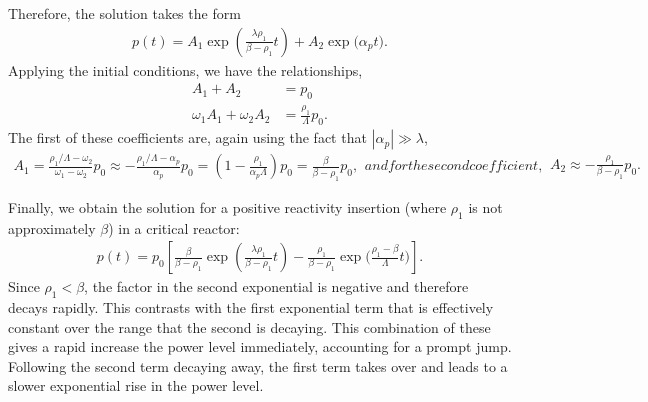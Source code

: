 Therefore, the solution takes the form
\begin{align}
  p(t) = A_1 \exp\left(  \frac{ \lambda \rho_1 }{ \beta - \rho_1 } t \right) + A_2 \exp\bigg( \alpha_p t \bigg) .
\end{align}
Applying the initial conditions, we have the relationships,
\begin{subequations}
\begin{align}
  A_1 + A_2 &= p_0 \\
  \omega_1 A_1 + \omega_2 A_2 &= \frac{\rho_1}{\Lambda} p_0 .
\end{align}
\end{subequations}
The first of these coefficients are, again using the fact that $|\alpha_p| \gg \lambda$,
\begin{subequations}
\begin{align}
  A_1 = \frac{ \rho_1 / \Lambda - \omega_2 }{ \omega_1 - \omega_2 } p_0 
  \approx -\frac{ \rho_1 / \Lambda - \alpha_p }{ \alpha_p } p_0 
  = \left( 1 - \frac{\rho_1}{\alpha_p \Lambda} \right) p_0 = \frac{ \beta }{ \beta - \rho_1 } p_0,
\end{align}
and for the second coefficient,
\begin{align}
  A_2 \approx -\frac{ \rho_1 }{ \beta - \rho_1 } p_0 .
\end{align}
\end{subequations}

Finally, we obtain the solution for a positive reactivity insertion (where $\rho_1$ is not approximately $\beta$) in a critical reactor:
\begin{align}
  p(t) = p_0 \left[ \frac{ \beta }{ \beta - \rho_1 }  \exp\left(  \frac{ \lambda \rho_1 }{ \beta - \rho_1 } t \right) - \frac{ \rho_1 }{ \beta - \rho_1 } \exp\bigg( \frac{ \rho_1 - \beta }{ \Lambda } t \bigg) \right] . \label{Eq:kinetics_fluxAmplitude_CriticalReactorPromptInsertionApproximate}
\end{align}
Since $\rho_1 < \beta$, the factor in the second exponential is negative and therefore decays rapidly. This contrasts with the first exponential term that is effectively constant over the range that the second is decaying. This combination of these gives a rapid increase the power level immediately, accounting for a prompt jump. Following the second term decaying away, the first term takes over and leads to a slower exponential rise in the power level.

